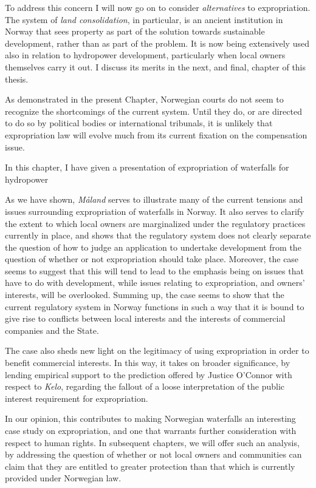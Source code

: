 To address this concern I will now go on to consider {\it alternatives} to expropriation. The system of {\it land consolidation}, in particular, is an ancient institution in Norway that sees property as part of the solution towards sustainable development, rather than as part of the problem. It is now being extensively used also in relation to hydropower development, particularly when local owners themselves carry it out. I discuss its merits in the next, and final, chapter of this thesis.

As demonstrated in the present Chapter, Norwegian courts do not seem to recognize the shortcomings of the current system. Until they do, or are directed to do so by political bodies or international tribunals, it is unlikely that expropriation law will evolve much from its current fixation on the compensation issue. 








In this chapter, I have given a presentation of expropriation of waterfalls for hydropower 

As we have shown, \emph{Måland} serves to illustrate many of the current tensions and issues surrounding expropriation of waterfalls in Norway. It also serves to clarify the extent to which local owners are 
marginalized under the regulatory practices currently in place, and shows that the regulatory system does not clearly separate the question of how to judge an application to undertake development from the question of whether or not expropriation should take place. Moreover, the case seems to suggest that this will tend to lead to the emphasis being on issues that have to do with development, while issues relating to expropriation, and owners' interests, will be overlooked. Summing up, the case seems to show that the current regulatory system in Norway functions in such a way that it is bound to give rise to conflicts between local interests and the interests of commercial companies and the State.

The case also sheds new light on the legitimacy of using expropriation in order to benefit commercial interests. In this way, it takes on broader significance, by lending empirical support to the prediction offered by Justice O'Connor with respect to \emph{Kelo}, regarding the fallout of a loose interpretation of the public interest requirement for expropriation.

In our opinion, this contributes to making Norwegian waterfalls an interesting case study on expropriation,  and one that warrants further consideration with respect to human rights. In subsequent chapters, we will offer such an analysis, by addressing the question of whether or not local owners and communities can claim that they are entitled to greater protection than that which is currently provided under Norwegian law.

